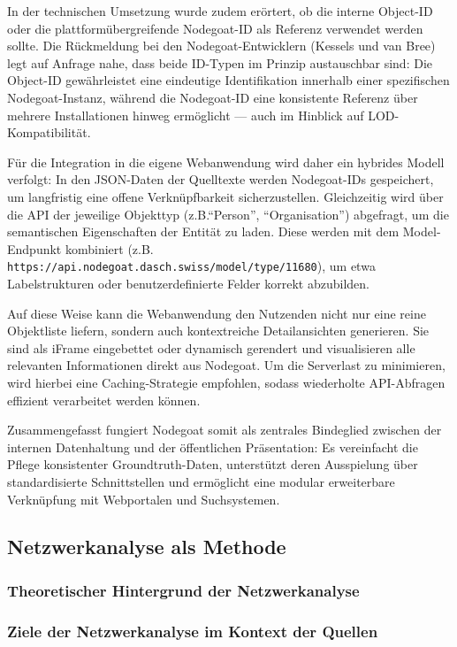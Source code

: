 \documentclass[12pt, a4paper, ngerman, bidi=default]{article}
\newcommand{\code}[1]{\colorbox{VeryLightGray}{\texttt{#1}}} %
\begin{document}
In der technischen Umsetzung wurde zudem erörtert, ob die interne Object-ID oder die plattformübergreifende Nodegoat-ID als Referenz verwendet werden sollte. Die Rückmeldung bei den
Nodegoat-Entwicklern (Kessels und van Bree) legt auf Anfrage nahe, dass beide ID-Typen im Prinzip austauschbar sind: Die Object-ID gewährleistet eine eindeutige Identifikation 
innerhalb einer spezifischen Nodegoat-Instanz, 
während die Nodegoat-ID eine konsistente Referenz über mehrere Installationen hinweg ermöglicht — auch im Hinblick auf LOD-Kompatibilität.

Für die Integration in die eigene Webanwendung wird daher ein hybrides Modell verfolgt: In den JSON-Daten der Quelltexte werden Nodegoat-IDs gespeichert, um langfristig eine offene Verknüpfbarkeit sicherzustellen. 
Gleichzeitig wird über die API der jeweilige Objekttyp (z.B.\enquote{Person}, \enquote{Organisation}) abgefragt, um die semantischen Eigenschaften der Entität zu laden. Diese werden mit dem 
Model-Endpunkt kombiniert (z.B. \code{https://api.nodegoat.dasch.swiss/model/type/11680}), um etwa Labelstrukturen oder benutzerdefinierte Felder korrekt abzubilden.

Auf diese Weise kann die Webanwendung den Nutzenden nicht nur eine reine Objektliste liefern, sondern auch kontextreiche Detailansichten generieren. Sie sind als iFrame eingebettet oder dynamisch 
gerendert und visualisieren alle relevanten Informationen direkt aus Nodegoat. Um die Serverlast zu minimieren, wird hierbei eine Caching-Strategie empfohlen, sodass wiederholte API-Abfragen 
effizient verarbeitet werden können.

Zusammengefasst fungiert Nodegoat somit als zentrales Bindeglied zwischen der internen Datenhaltung und der öffentlichen Präsentation: Es vereinfacht die Pflege konsistenter Groundtruth-Daten, 
unterstützt deren Ausspielung über standardisierte Schnittstellen und ermöglicht eine modular erweiterbare Verknüpfung mit Webportalen und Suchsystemen.



\subsection{Netzwerkanalyse als Methode}
  \subsubsection{Theoretischer Hintergrund der Netzwerkanalyse}
  \subsubsection{Ziele der Netzwerkanalyse im Kontext der Quellen}
\end{document}
